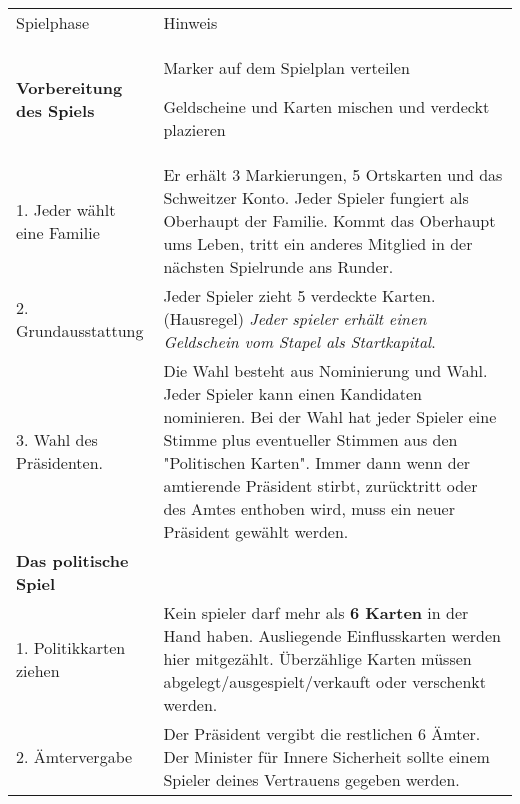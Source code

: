 \documentclass[5pt]{article}
\begin{document}
 \begin{tabular}{p{4cm}p{14.5cm}}
 	\toprule
	\addlinespace
    		Spielphase & Hinweis \\
	\addlinespace
    	
	\midrule
    	\addlinespace
    		\textbf{Vorbereitung des Spiels }   & 
								\begin{minipage} [t] {0.6\textwidth} 
        								\begin{citemize}
	   								\item Marker auf dem Spielplan verteilen
									\item Geldscheine und Karten mischen und verdeckt plazieren 
								\end{citemize} 
								\end{minipage}\\
     		1. Jeder  wählt eine Familie 				&	Er erhält 3 Markierungen, 5 Ortskarten und das Schweitzer Konto.
												Jeder Spieler fungiert als Oberhaupt der Familie. Kommt das Oberhaupt ums Leben,
												 tritt ein anderes Mitglied in der nächsten Spielrunde ans Runder. \\
    
     		2. Grundausstattung						& 	Jeder Spieler zieht 5 verdeckte Karten.  (Hausregel) \textit{Jeder spieler erhält einen Geldschein vom Stapel als Startkapital}.   \\
    
    		3. Wahl des Präsidenten. 					&	Die Wahl besteht aus Nominierung und Wahl. Jeder Spieler kann einen Kandidaten nominieren.
													Bei der Wahl hat jeder Spieler eine Stimme plus eventueller Stimmen aus den "Politischen Karten".
													Immer dann wenn der amtierende Präsident stirbt, zurücktritt oder des Amtes enthoben wird, muss ein neuer Präsident gewählt werden. \\
	\addlinespace
    	\midrule
    		\textbf{Das politische Spiel }    \\
    	\addlinespace
     		
		1. Politikkarten ziehen	& 	Kein spieler darf mehr als \textbf{6 Karten} in der Hand haben. Ausliegende Einflusskarten werden hier mitgezählt. Überzählige Karten müssen abgelegt/ausgespielt/verkauft oder verschenkt werden. \\
         	
		2. Ämtervergabe		& 	Der Präsident vergibt die restlichen 6 Ämter. Der Minister für Innere Sicherheit sollte einem Spieler deines Vertrauens gegeben werden. \\
         	

\end{tabular}
\end{document}
